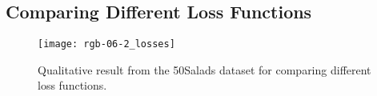 \documentclass[10pt,twocolumn,letterpaper]{article}
\begin{document}
\begin{table}[tb]
\centering
{}
\caption{Comparing a multi-stage TCN with a deep single-stage TCN on the 50Salads dataset.}
\label{tab:more_layers}
\end{table}


\subsection{Comparing Different Loss Functions}

\begin{table}[tb]
\centering
{}
\caption{Comparing different loss functions on the 50Salads dataset.}
\label{tab:loss_function}
\end{table}

\begin{figure}[tb]
\begin{center}
   \texttt{[image: rgb-06-2\_losses]}
\end{center}
   \caption{Qualitative result from the 50Salads dataset for comparing different loss functions.}
\label{fig:loss_functions}
\end{figure}
\end{document}
